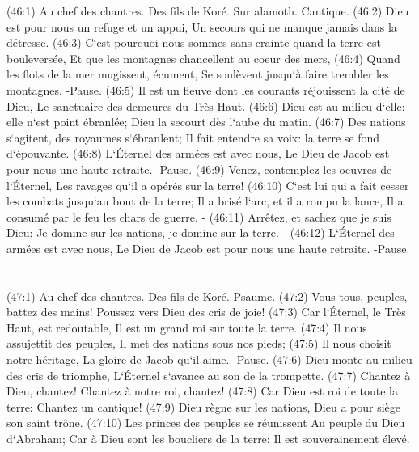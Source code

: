 \verse (46:1) Au chef des chantres. Des fils de Koré. Sur alamoth. Cantique. (46:2) Dieu est pour nous un refuge et un appui, Un secours qui ne manque jamais dans la détresse. 
\verse (46:3) C`est pourquoi nous sommes sans crainte quand la terre est bouleversée, Et que les montagnes chancellent au coeur des mers, 
\verse (46:4) Quand les flots de la mer mugissent, écument, Se soulèvent jusqu`à faire trembler les montagnes. -Pause. 
\verse (46:5) Il est un fleuve dont les courants réjouissent la cité de Dieu, Le sanctuaire des demeures du Très Haut. 
\verse (46:6) Dieu est au milieu d`elle: elle n`est point ébranlée; Dieu la secourt dès l`aube du matin. 
\verse (46:7) Des nations s`agitent, des royaumes s`ébranlent; Il fait entendre sa voix: la terre se fond d`épouvante. 
\verse (46:8) L`Éternel des armées est avec nous, Le Dieu de Jacob est pour nous une haute retraite. -Pause. 
\verse (46:9) Venez, contemplez les oeuvres de l`Éternel, Les ravages qu`il a opérés sur la terre! 
\verse (46:10) C`est lui qui a fait cesser les combats jusqu`au bout de la terre; Il a brisé l`arc, et il a rompu la lance, Il a consumé par le feu les chars de guerre. - 
\verse (46:11) Arrêtez, et sachez que je suis Dieu: Je domine sur les nations, je domine sur la terre. - 
\verse (46:12) L`Éternel des armées est avec nous, Le Dieu de Jacob est pour nous une haute retraite. -Pause. 

\chapter{}

\verse (47:1) Au chef des chantres. Des fils de Koré. Psaume. (47:2) Vous tous, peuples, battez des mains! Poussez vers Dieu des cris de joie! 
\verse (47:3) Car l`Éternel, le Très Haut, est redoutable, Il est un grand roi sur toute la terre. 
\verse (47:4) Il nous assujettit des peuples, Il met des nations sous nos pieds; 
\verse (47:5) Il nous choisit notre héritage, La gloire de Jacob qu`il aime. -Pause. 
\verse (47:6) Dieu monte au milieu des cris de triomphe, L`Éternel s`avance au son de la trompette. 
\verse (47:7) Chantez à Dieu, chantez! Chantez à notre roi, chantez! 
\verse (47:8) Car Dieu est roi de toute la terre: Chantez un cantique! 
\verse (47:9) Dieu règne sur les nations, Dieu a pour siège son saint trône. 
\verse (47:10) Les princes des peuples se réunissent Au peuple du Dieu d`Abraham; Car à Dieu sont les boucliers de la terre: Il est souverainement élevé. 

